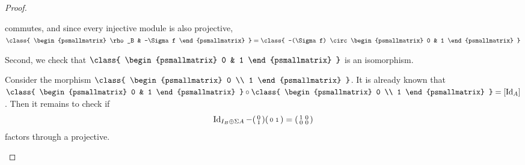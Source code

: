 \begin{proof}
\begin{enumerate}[label={(\bfseries TR\arabic*)}]
{\begin{center}
            \end{center}
            commutes, and since every injective module is also projective, \(\class{
                    \begin{psmallmatrix}
                        \rho_B & -\Sigma f
                    \end{psmallmatrix}
                }
                =
                \class{
                    -(\Sigma f) \circ
                    \begin{psmallmatrix}
                        0 & 1
                    \end{psmallmatrix}
                }
            \)

            Second, we check that \( \class{
                \begin{psmallmatrix}
                    0 & 1
                \end{psmallmatrix}
            } \) is an isomorphism.

            Consider the morphism \( \class{
                \begin{psmallmatrix}
                    0 \\
                    1
                \end{psmallmatrix}
            } \).
            It is already known that \( \class{
                \begin{psmallmatrix}
                    0 & 1
                \end{psmallmatrix}
            } \circ \class{
                \begin{psmallmatrix}
                    0 \\
                    1
                \end{psmallmatrix}
            } = [\Id_A] \).
            Then it remains to check if
            \[
                \operatorname{Id}_{I_B \oplus \Sigma A} -
                \begin{psmallmatrix}
                    0 \\
                    1
                \end{psmallmatrix}
                \begin{psmallmatrix}
                    0 & 1
                \end{psmallmatrix}
                =
                \begin{psmallmatrix}
                    1 & 0 \\
                    0 & 0
                \end{psmallmatrix}
            \]
            factors through a projective.

}
\end{enumerate}
\end{proof}
